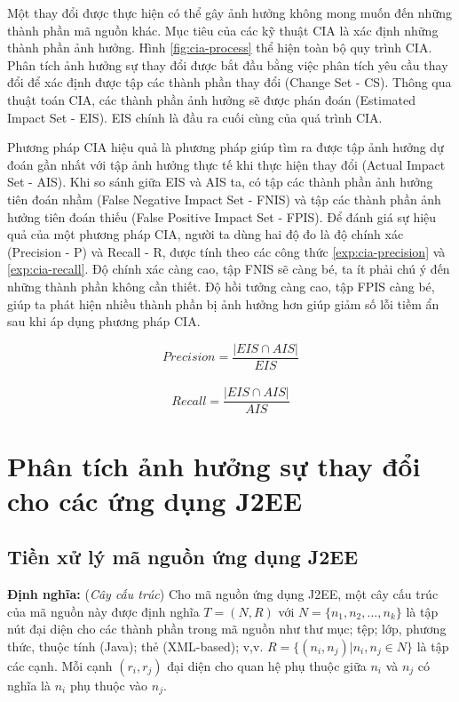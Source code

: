 \documentclass[12pt]{report}
\begin{document}
Một thay đổi được thực hiện có thể gây ảnh hưởng không mong muốn đến những thành phần mã nguồn khác. Mục tiêu của các kỹ thuật CIA là xác định những thành phần ảnh hưởng. Hình \ref{fig:cia-process} thể hiện toàn bộ quy trình CIA. Phân tích ảnh hưởng sự thay đổi được bắt đầu bằng việc phân tích yêu cầu thay đổi để xác định được tập các thành phần thay đổi (Change Set - CS). Thông qua thuật toán CIA, các thành phần ảnh hưởng sẽ được phán đoán (Estimated Impact Set - EIS). EIS chính là đầu ra cuối cùng của quá trình CIA.

Phương pháp CIA hiệu quả là phương pháp giúp tìm ra được tập ảnh hưởng dự đoán gần nhất với tập ảnh hưởng thực tế khi thực hiện thay đổi (Actual Impact Set - AIS). Khi so sánh giữa EIS và AIS ta, có tập các thành phần ảnh hưởng tiên đoán nhầm (False Negative Impact Set - FNIS) và tập các thành phần ảnh hưởng tiên đoán thiếu (False Positive Impact Set - FPIS). Để đánh giá sự hiệu quả của một phương pháp CIA, người ta dùng hai độ đo là độ chính xác (Precision - P) và Recall - R, được tính theo các công thức \ref{exp:cia-precision} và \ref{exp:cia-recall}. Độ chính xác càng cao, tập FNIS sẽ càng bé, ta ít phải chú ý đến những thành phần không cần thiết. Độ hồi tưởng càng cao, tập FPIS càng bé, giúp ta phát hiện nhiều thành phần bị ảnh hưởng hơn giúp giảm số lỗi tiềm ẩn sau khi áp dụng phương pháp CIA.

\begin{equation}
	Precision = \frac{|EIS \cap AIS|}{EIS}
	\label{exp:cia-precision}
\end{equation}
\\
\begin{equation}
	Recall = \frac{|EIS \cap AIS|}{AIS}
	\label{exp:cia-recall}
\end{equation}

\newpage
\chapter{Phân tích ảnh hưởng sự thay đổi cho các ứng dụng J2EE}
\section{Tiền xử lý mã nguồn ứng dụng J2EE}
\textbf{Định nghĩa:} (\textit{Cây cấu trúc}) Cho mã nguồn ứng dụng J2EE, một cây cấu trúc của mã nguồn này được định nghĩa $T = (N, R)$ với $N = \{n_1, n_2,..., n_k\}$ là tập nút đại diện cho các thành phần trong mã nguồn như thư mục; tệp; lớp, phương thức, thuộc tính (Java); thẻ (XML-based); v,v. $R = \{(n_i, n_j) | n_i,n_j \in N\}$ là tập các cạnh. Mỗi cạnh $(r_i,r_j)$ đại diện cho quan hệ phụ thuộc giữa $n_i$ và $n_j$ có nghĩa là $n_i$ phụ thuộc vào $n_j$.
\end{document}

